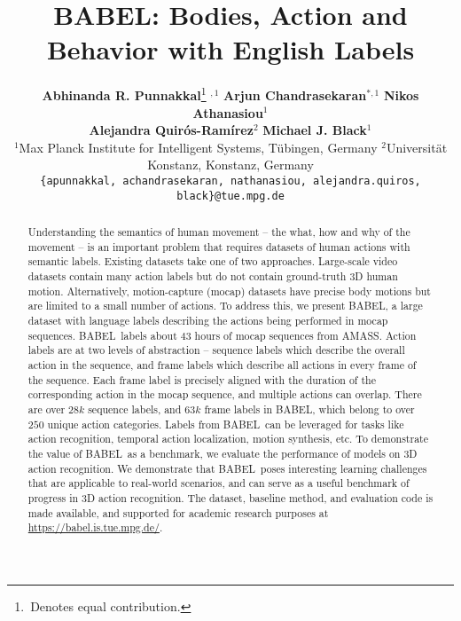 \documentclass[final]{cvpr}
\def\babel{BABEL}
\begin{document}
\title{BABEL: Bodies, Action and Behavior with English Labels}

\author{
    \textbf{Abhinanda R. Punnakkal}\thanks{\,Denotes equal contribution.}$\,\,^{,1}$  \qquad
    \textbf{Arjun Chandrasekaran}$^{*,1}$ \qquad 
    \textbf{Nikos Athanasiou}$^{1}$ \qquad \\
    \textbf{Alejandra Quirós-Ramírez}$^{2}$ \qquad 
    \textbf{Michael J. Black}$^{1}$ \qquad \\
    \small{$^1$Max Planck Institute for Intelligent Systems, T\"{u}bingen, Germany \quad
    $^2$Universit\"{a}t Konstanz, Konstanz, Germany} \\
    {\tt\small \{apunnakkal, achandrasekaran, nathanasiou, alejandra.quiros, black\}@tue.mpg.de} 
}

\maketitle

\begin{abstract}
Understanding the semantics of human movement -- the what, how and why of the movement -- is an important problem that requires datasets of human actions with semantic labels. 
Existing datasets take one of two approaches.
Large-scale video datasets contain many action labels but do not contain ground-truth 3D human motion.
Alternatively, motion-capture (mocap) datasets have precise body motions but are limited to a small number of actions. 
To address this, we present \babel, a large dataset with language labels describing the actions being performed in mocap sequences. 
\babel~labels about $43$ hours of mocap sequences from AMASS.
Action labels are at two levels of abstraction -- sequence labels which describe the overall action in the sequence, and frame labels which describe all actions in every frame of the sequence. 
Each frame label is precisely aligned with the duration of the corresponding action in the mocap sequence, and multiple actions can overlap. 
There are over $28k$ sequence labels, and $63k$ frame labels in BABEL, which belong to over $250$ unique action categories. 
Labels from \babel~can be leveraged for tasks like action recognition, temporal action localization, motion synthesis, etc. 
To demonstrate the value of \babel~as a benchmark, we evaluate the performance of models on 3D action recognition. 
We demonstrate that \babel~poses interesting learning challenges that are applicable to real-world scenarios, and can serve as a useful benchmark of progress in 3D action recognition. 
The dataset, baseline method, and evaluation code is made available, and supported for academic research purposes at \url{https://babel.is.tue.mpg.de/}.
\end{abstract}
\end{document}
